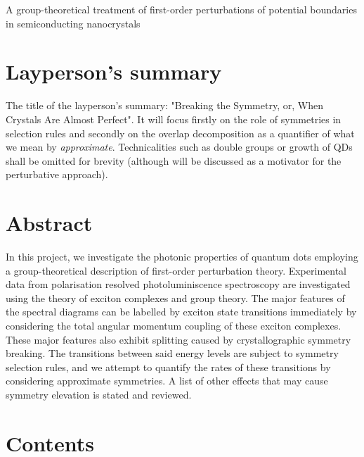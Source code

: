 \documentclass[12pt]{article}
\begin{document}



%

\begin{huge}
A group-theoretical treatment of first-order perturbations of potential boundaries in semiconducting nanocrystals
\end{huge}

\section{Layperson's summary}

The title of the layperson's summary: "Breaking the Symmetry, or, When Crystals Are Almost Perfect". It will focus firstly on the role of symmetries in selection rules and secondly on the overlap decomposition as a quantifier of what we mean by \textit{approximate}. Technicalities such as double groups or growth of QDs shall be omitted for brevity (although \cite{hexagon} will be discussed as a motivator for the perturbative approach).

\section{Abstract}

In this project, we investigate the photonic properties of quantum dots employing a group-theoretical description of first-order perturbation theory. Experimental data from polarisation resolved photoluminiscence spectroscopy are investigated using the theory of exciton complexes and group theory. The major features of the spectral diagrams can be labelled by exciton state transitions immediately by considering the total angular momentum coupling of these exciton complexes. These major features also exhibit splitting caused by crystallographic symmetry breaking. The transitions between said energy levels are subject to symmetry selection rules, and we attempt to quantify the rates of these transitions by considering approximate symmetries. A list of other effects that may cause symmetry elevation is stated and reviewed.

\section{Contents}
\end{document}
